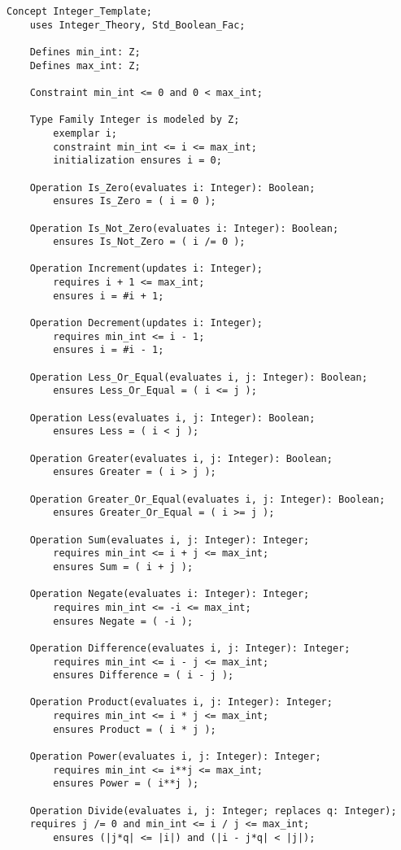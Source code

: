 \begin{lstlisting}[language=resolve]
Concept Integer_Template;
	uses Integer_Theory, Std_Boolean_Fac;

    Defines min_int: Z;
    Defines max_int: Z;

    Constraint min_int <= 0 and 0 < max_int;

    Type Family Integer is modeled by Z;
        exemplar i;
        constraint min_int <= i <= max_int;
        initialization ensures i = 0;

    Operation Is_Zero(evaluates i: Integer): Boolean;
        ensures	Is_Zero = ( i = 0 );

    Operation Is_Not_Zero(evaluates i: Integer): Boolean;
        ensures	Is_Not_Zero = ( i /= 0 );

    Operation Increment(updates i: Integer);
        requires i + 1 <= max_int;
        ensures	i = #i + 1;

    Operation Decrement(updates i: Integer);
        requires min_int <= i - 1;
        ensures	i = #i - 1;

    Operation Less_Or_Equal(evaluates i, j: Integer): Boolean;
        ensures	Less_Or_Equal = ( i <= j );

    Operation Less(evaluates i, j: Integer): Boolean;
        ensures Less = ( i < j );

    Operation Greater(evaluates i, j: Integer): Boolean;
        ensures Greater = ( i > j );

    Operation Greater_Or_Equal(evaluates i, j: Integer): Boolean;
        ensures Greater_Or_Equal = ( i >= j );

    Operation Sum(evaluates i, j: Integer): Integer;
        requires min_int <= i + j <= max_int;
        ensures	Sum = ( i + j );

    Operation Negate(evaluates i: Integer): Integer;
        requires min_int <= -i <= max_int;
        ensures Negate = ( -i );

    Operation Difference(evaluates i, j: Integer): Integer;
        requires min_int <= i - j <= max_int;
        ensures Difference = ( i - j );

    Operation Product(evaluates i, j: Integer): Integer;
        requires min_int <= i * j <= max_int;
        ensures Product = ( i * j );

    Operation Power(evaluates i, j: Integer): Integer;
        requires min_int <= i**j <= max_int;
        ensures Power = ( i**j );

    Operation Divide(evaluates i, j: Integer; replaces q: Integer);
	requires j /= 0 and min_int <= i / j <= max_int;
        ensures (|j*q| <= |i|) and (|i - j*q| < |j|);


\end{lstlisting}
